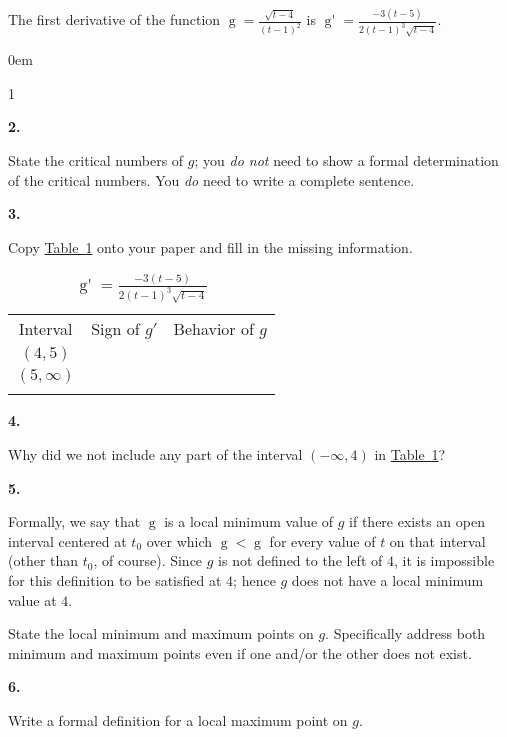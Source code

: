 \documentclass[12pt,]{book}
\newcommand{\lt}{<}
\theoremstyle{plain}
\theoremstyle{definition}
\numberwithin{equation}{section}
\newcommand{\hrulethin}  {\noalign{\hrule height 0.04em}}
\newcommand{\hrulemedium}{\noalign{\hrule height 0.07em}}
\newcommand{\hrulethick} {\noalign{\hrule height 0.11em}}
\newenvironment{exercisegroup}%
{\medskip\noindent}%
{\par\bigskip}%
\newlength{\exercisegroupindent}%
\newlength{\exercisegroupitemwidth}%
\newenvironment{exercisegrouplist}%
{\vspace{-\partopsep}%
\begin{adjustwidth}{\exercisegroupindent}{0em}}%
{\end{adjustwidth}%
\vspace{-\partopsep}%
\vspace{\baselineskip}}%
\newenvironment{exercisegroupbycol}[1]%
{\begin{exercisegrouplist}%
\vspace{-\multicolsep}%
\begin{multicols}{#1}%
\setlength{\parindent}{0em}%
\setlength{\exercisegroupitemwidth}{\linewidth}}%
{\end{multicols}%
\vspace{-\multicolsep}%
\end{exercisegrouplist}}%
\newenvironment{exercisegroupitem}[1]%
{\begin{minipage}[t]{\exercisegroupitemwidth}
\vspace{0pt}%
{\bfseries#1}%
\rule{0pt}{\baselineskip}}{\strut%
\end{minipage}%
\hspace{\columnsep}}%
\providecommand\phantomsection{}
\newcommand{\fe}[2]{\mathop{{#1}{\left(#2\right)}}}
\newcommand{\ointerval}[2]{\left(#1,#2\right)}
\newcommand{\fd}[1]{#1'}
\begin{document}
\begin{exercisegroup}%
The first derivative of the function \(\fe{g}{t}=\frac{\sqrt{t-4}}{(t-1)^2}\) is \(\fe{\fd{g}}{t}=\frac{-3(t-5)}{2(t-1)^3\sqrt{t-4}}\).%
\par
\begin{exercisegroupbycol}{1}%
\begin{exercisegroupitem}{2. }\phantomsection\hypertarget{exercise-413}{\null}
State the critical numbers of \(g\); you \emph{do not} need to show a formal determination of the critical numbers.  You \emph{do} need to write a complete sentence.%
\end{exercisegroupitem}%
\par%
\begin{exercisegroupitem}{3. }\phantomsection\hypertarget{exercise-414}{\null}
Copy \hyperref[table-semi-rational-sign-table]{Table~\ref*{table-semi-rational-sign-table}} onto your paper and fill in the missing information.%
\begin{table}
\centering
\caption{\(\fe{\fd{g}}{t}=\frac{-3(t-5)}{2(t-1)^3\sqrt{t-4}}\)\label{table-semi-rational-sign-table}}
\begin{tabular}{ccc}\hrulethick
Interval&Sign of \(\fd{g}\)&Behavior of \(g\)\\\hrulemedium
\(\ointerval{4}{5}\)&&\\\hrulethin
\(\ointerval{5}{\infty}\)&&\\\hrulethick
\end{tabular}
\end{table}
\end{exercisegroupitem}%
\par%
\begin{exercisegroupitem}{4. }\phantomsection\hypertarget{exercise-415}{\null}
Why did we not include any part of the interval \(\ointerval{-\infty}{4}\) in \hyperref[table-semi-rational-sign-table]{Table~\ref*{table-semi-rational-sign-table}}?%
\end{exercisegroupitem}%
\par%
\begin{exercisegroupitem}{5. }\phantomsection\hypertarget{exercise-416}{\null}
Formally, we say that \(\fe{g}{t_0}\) is a local minimum value of \(g\) if there exists an open interval centered at \(t_0\) over which \(\fe{g}{t_0}\lt\fe{g}{t}\) for every value of \(t\) on that interval (other than \(t_0\), of course).  Since \(g\) is not defined to the left of \(4\), it is impossible for this definition to be satisfied at \(4\); hence \(g\) does not have a local minimum value at \(4\).%
\par
State the local minimum and maximum points on \(g\).  Specifically address both minimum and maximum points even if one and/or the other does not exist.%
\end{exercisegroupitem}%
\par%
\begin{exercisegroupitem}{6. }\phantomsection\hypertarget{exercise-417}{\null}
Write a formal definition for a local maximum point on \(g\).%
\end{exercisegroupitem}%
\par%
\end{exercisegroupbycol}%
\end{exercisegroup}%
\end{document}
